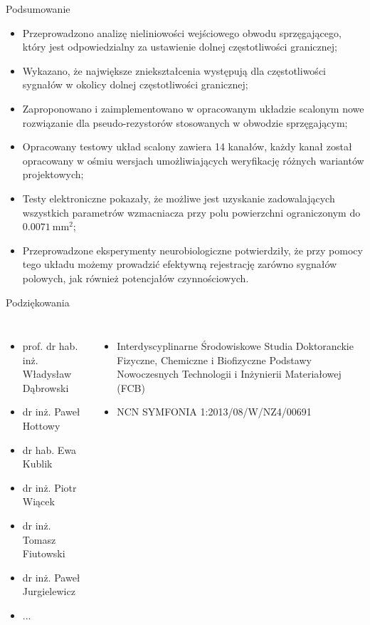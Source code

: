     \begin{frame}{Podsumowanie}
    \begin{itemize}
        \item Przeprowadzono analizę nieliniowości wejściowego obwodu sprzęgającego, który jest odpowiedzialny za ustawienie dolnej częstotliwości granicznej;
        \item Wykazano, że największe zniekształcenia występują dla częstotliwości sygnałów w okolicy dolnej częstotliwości granicznej;
        \item Zaproponowano i zaimplementowano w opracowanym układzie scalonym nowe rozwiązanie dla pseudo-rezystorów stosowanych w obwodzie sprzęgającym;
        \item Opracowany testowy układ scalony zawiera 14 kanałów, każdy kanał został opracowany w ośmiu wersjach umożliwiających weryfikację różnych wariantów projektowych;
        \item Testy elektroniczne pokazały, że możliwe jest uzyskanie zadowalających wszystkich parametrów wzmacniacza  przy polu powierzchni  ograniczonym do $\SI{0.0071}{\milli\metre\squared}$;
        \item Przeprowadzone eksperymenty neurobiologiczne potwierdziły, że przy pomocy tego układu możemy prowadzić efektywną rejestrację zarówno sygnałów polowych, jak również potencjałów czynnościowych.
    \end{itemize}
    \end{frame}

    \begin{frame}{Podziękowania}
      
      \begin{columns}

        \begin{itemize}
          \item prof. dr hab. inż. Władysław Dąbrowski
          \item dr inż. Paweł Hottowy
          \item dr hab. Ewa Kublik
          \item dr inż. Piotr Wiącek
          \item dr inż. Tomasz Fiutowski
          \item dr inż. Paweł Jurgielewicz
          \item ...
        \end{itemize}
    
        \begin{itemize}
          \item Interdyscyplinarne Środowiskowe Studia Doktoranckie Fizyczne, Chemiczne i Biofizyczne Podstawy Nowoczesnych
          Technologii i Inżynierii Materiałowej (FCB)
          \item NCN SYMFONIA 1:2013/08/W/NZ4/00691
        \end{itemize}
    \end{columns}
    \end{frame}